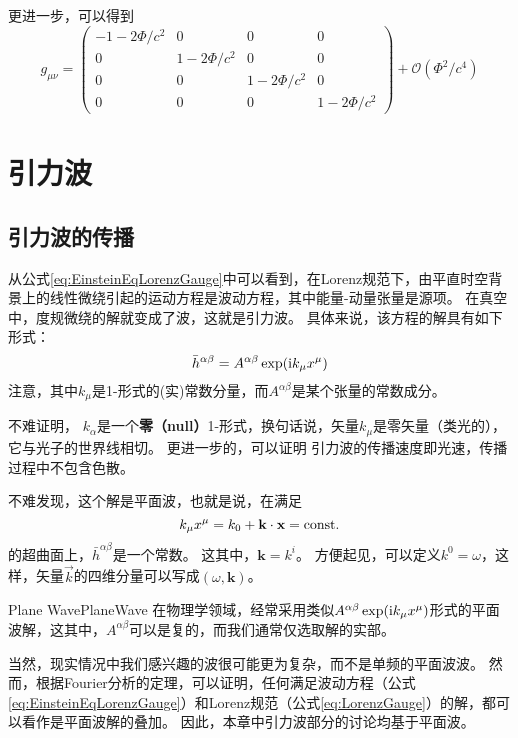 更进一步，可以得到
\begin{equation}\label{eq:NewtonianMetric}
  g_{\mu\nu} ={\begin{pmatrix}
    -1-2\Phi/c^2 & 0 & 0 & 0\\
    0 & 1-2\Phi/c^2 & 0 & 0\\ 
    0 & 0 & 1-2\Phi/c^2 & 0\\
    0 & 0 & 0 & 1-2\Phi/c^2\end{pmatrix}} + \mathcal{O}(\Phi^2/c^4)
\end{equation}


\section{引力波}
\subsection{引力波的传播}
从公式\ref{eq:EinsteinEqLorenzGauge}中可以看到，在Lorenz规范下，由平直时空背景上的线性微绕引起的运动方程是波动方程，其中能量-动量张量是源项。
在真空中，度规微绕的解就变成了波，这就是引力波。
具体来说，该方程的解具有如下形式：
\begin{equation}\label{eq:GWsolution} 
  \bar{h}^{\alpha\beta} =  A^{\alpha\beta} \exp({\rm i} k_\mu x^\mu)
\end{equation}
注意，其中${k_\mu}$是1-形式的(实)常数分量，而$A^{\alpha\beta}$是某个张量的常数成分。

不难证明，%
$k_\alpha$是一个{\textbf{零（null）}}1-形式，换句话说，矢量$k_\mu$是零矢量（类光的），它与光子的世界线相切。
更进一步的，可以证明%
引力波的传播速度即光速，传播过程中不包含色散。%

不难发现，这个解是平面波，也就是说，在满足
\begin{equation}\label{eq:PlaneWave} 
  k_\mu x^\mu = k_0+\textbf{k}\cdot\textbf{x} =  {\rm const.}
\end{equation}
的超曲面上，$\bar{h}^{\alpha\beta} $是一个常数。
这其中，$\textbf{k}={k^i}$。
方便起见，可以定义$k^0=\omega$，这样，矢量$\vec{k}$的四维分量可以写成$(\omega,\textbf{k})$。
\begin{myprop}{Plane Wave}{PlaneWave}
  在物理学领域，经常采用类似$A^{\alpha\beta} \exp({\rm i} k_\mu x^\mu)$形式的平面波解，这其中，$A^{\alpha\beta}$可以是复的，而我们通常仅选取解的实部。

  当然，现实情况中我们感兴趣的波很可能更为复杂，而不是单频的平面波波。
  然而，根据Fourier分析的定理，可以证明，任何满足波动方程（公式\ref{eq:EinsteinEqLorenzGauge}）和Lorenz规范（公式\ref{eq:LorenzGauge}）的解，都可以看作是平面波解的叠加。
  因此，本章中引力波部分的讨论均基于平面波。
\end{myprop}

